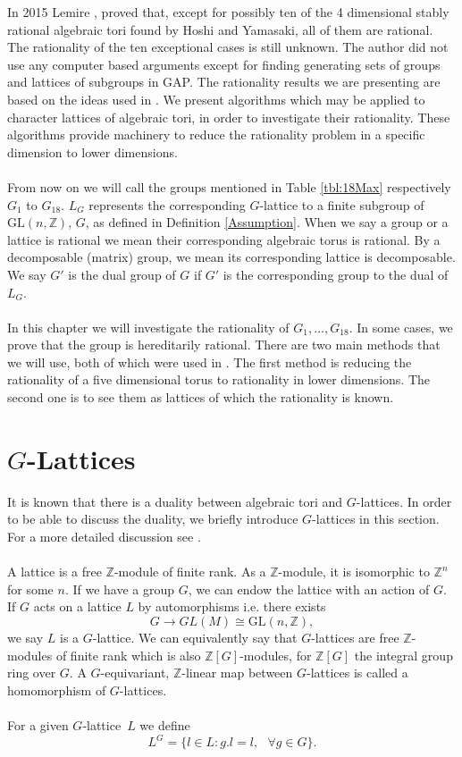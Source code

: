 \documentclass{article}
\theoremstyle{plain}
\theoremstyle{definition}
\newcommand{\Z}{\ensuremath{\mathbb{Z}}}
\newcommand{\G}{G}
\newcommand{\glat}{$G$-lattice}
\begin{document}
\noindent
In 2015 Lemire \cite{Nicole1}, proved that, except for possibly ten of the 
4 dimensional stably rational algebraic tori found by Hoshi and Yamasaki, 
all of them are rational. The rationality of the ten exceptional cases is 
still unknown. The author did not use any computer based arguments except 
for finding generating sets of groups and lattices of subgroups in GAP. The 
rationality results we are presenting are based on the ideas used in \cite{Nicole1}. 
We present algorithms which may be applied to character lattices of algebraic 
tori, in order to investigate their rationality. These algorithms provide 
machinery to reduce the rationality problem in a specific dimension to lower dimensions.\\
\\
From now on we will call the groups mentioned in Table \ref{tbl:18Max} 
respectively $G_1$ to $G_{18}$. $L_G$ represents the corresponding $G$-lattice 
to a finite subgroup of $\mathrm{GL}(n,\Z)$, $G$, as defined in Definition 
\ref{Assumption}. When we say a group or a lattice is rational we mean their 
corresponding algebraic torus is rational. By a decomposable (matrix) group, 
we mean its corresponding lattice is decomposable. We say $G'$ is the dual 
group of $G$ if $G'$ is the corresponding group to the dual of $L_G$.  \\
\\
In this chapter we will investigate the rationality of $G_1, \ldots ,  G_{18}$. 
In some cases, we prove that the group is hereditarily rational. There are two 
main methods that we will use, both of which were used in \cite{Nicole1}. The 
first method is reducing the rationality of a five dimensional torus to rationality 
in lower dimensions. The second one is to see them as lattices of which the rationality is known.

\section{$G$-Lattices}\label{G-Lattices}
It is known that there is a duality between algebraic tori and \glat s. In order to be able to discuss the duality, we briefly introduce \glat s in this section. For a more detailed discussion see \cite[Chapters 1 and 2]{Lorenz}.\\ \\
A lattice is a free $\mathbb{Z}$-module of finite rank. As a $\Z$-module, it is isomorphic to $\mathbb{Z}^n$ for some $n$. If we have a group $G$, we can endow the lattice with an action of $G$. If $G$ acts on a lattice $L$ by automorphisms i.e. there exists $$ G \longrightarrow GL(M) \cong \mathrm{GL}(n,\mathbb{Z}),$$ 
we say $L$ is a $G$-lattice. We can equivalently say that $\G$-lattices are free $\Z$-modules of finite rank which is also $\mathbb{Z}[G]$-modules, for $\mathbb{Z}[G]$ the integral group ring over $G$. A $G$-equivariant, $ \mathbb{Z}$-linear map between $G$-lattices is called a homomorphism of $G$-lattices.\\
\\For a given \glat \, $L$ we define $$ L^\G = \lbrace l \in L : g.l=l,  \,\, \,\,  \forall g \in \G \rbrace. $$
\end{document}
